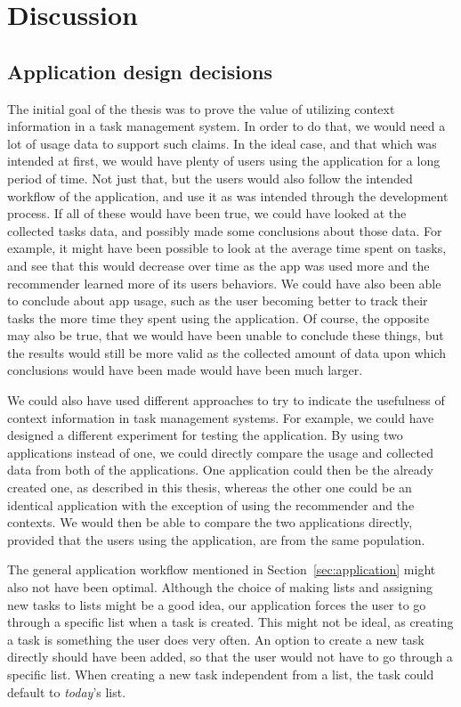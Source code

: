 \chapter{Discussion}
\label{chap:discussion}

\section{Application design decisions}

The initial goal of the thesis was to prove the value of utilizing context information in a task management system. In order to do that, we would need a lot of usage data to support such claims. In the ideal case, and that which was intended at first, we would have plenty of users using the application for a long period of time. Not just that, but the users would also follow the intended workflow of the application, and use it as was intended through the development process. If all of these would have been true, we could have looked at the collected tasks data, and possibly made some conclusions about those data. For example, it might have been possible to look at the average time spent on tasks, and see that this would decrease over time as the app was used more and the recommender learned more of its users behaviors. We could have also been able to conclude about app usage, such as the user becoming better to track their tasks the more time they spent using the application. Of course, the opposite may also be true, that we would have been unable to conclude these things, but the results would still be more valid as the collected amount of data upon which conclusions would have been made would have been much larger.

We could also have used different approaches to try to indicate the usefulness of context information in task management systems. For example, we could have designed a different experiment for testing the application. By using two applications instead of one, we could directly compare the usage and collected data from both of the applications. One application could then be the already created one, as described in this thesis, whereas the other one could be an identical application with the exception of using the recommender and the contexts. We would then be able to compare the two applications directly, provided that the users using the application, are from the same population.

The general application workflow mentioned in Section~\ref{sec:application} might also not have been optimal. Although the choice of making lists and assigning new tasks to lists might be a good idea, our application forces the user to go through a specific list when a task is created. This might not be ideal, as creating a task is something the user does very often. An option to create a new task directly should have been added, so that the user would not have to go through a specific list. When creating a new task independent from a list, the task could default to \emph{today}'s list.

